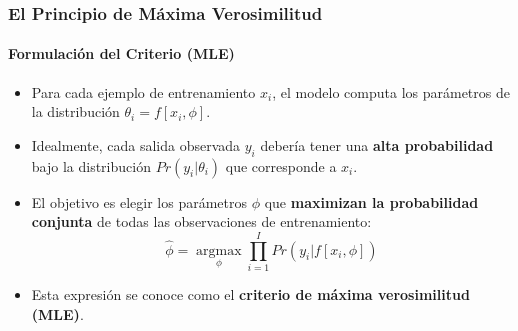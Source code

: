\documentclass[aspectratio=169, 10pt]{beamer}
\begin{document}
\begin{frame}[shrink]
	\frametitle{El Principio de Máxima Verosimilitud}
	\framesubtitle{Formulación del Criterio (MLE)}
	\begin{itemize}
		\item Para cada ejemplo de entrenamiento \(x_i\), el modelo computa los parámetros de la distribución \(\theta_i = f[x_i, \phi]\).
		\item Idealmente, cada salida observada $y_i$ debería tener una \textbf{alta probabilidad} bajo la distribución \(Pr(y_i|\theta_i)\) que corresponde a \(x_i\).
		\item El objetivo es elegir los parámetros \(\phi\) que \textbf{maximizan la probabilidad conjunta} de todas las observaciones de entrenamiento:
		\begin{equation*}
			\hat{\phi} = \underset{\phi}{\operatorname{argmax}} \prod_{i=1}^{I} Pr(y_i|f[x_i, \phi]) \tag{5.1}
		\end{equation*}
		\item Esta expresión se conoce como el \textbf{criterio de máxima verosimilitud (MLE)}.
	\end{itemize}
\end{frame}
\end{document}
